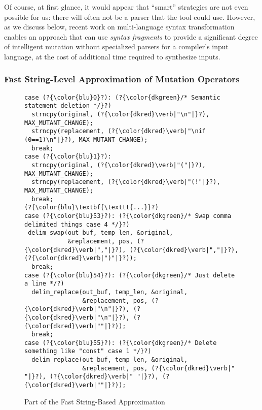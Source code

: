 Of course, at first
glance, it would appear that  ``smart'' strategies are not even
possible for us: there will often not be a parser that the
tool could use.  However, as we discuss below, recent work on
multi-language syntax transformation~\cite{combypaper} enables an approach that can use
\emph{syntax fragments} to provide a significant degree of intelligent
mutation without specialized parsers for a compiler's input language,
at the cost of additional time required to synthesize inputs.

\begin{sloppypar}
\subsubsection{Fast String-Level Approximation of Mutation Operators}
\label{strat-fast-string-level}

\begin{figure}[h!]
\begin{lstlisting}[basicstyle=\scriptsize\ttfamily,numbers=none,xleftmargin=0.7em,xrightmargin=.7em]
case (?{\color{blu}0}?): (?{\color{dkgreen}/* Semantic statement deletion */}?)
  strncpy(original, (?{\color{dkred}\verb|"\n"|}?), MAX_MUTANT_CHANGE);
  strncpy(replacement, (?{\color{dkred}\verb|"\nif (0==1)\n"|}?), MAX_MUTANT_CHANGE);
  break;
case (?{\color{blu}1}?):
  strncpy(original, (?{\color{dkred}\verb|"("|}?), MAX_MUTANT_CHANGE);
  strncpy(replacement, (?{\color{dkred}\verb|"(!"|}?), MAX_MUTANT_CHANGE);
  break;
(?{\color{blu}\textbf{\texttt{...}}?)
case (?{\color{blu}53}?): (?{\color{dkgreen}/* Swap comma delimited things case 4 */}?)
 delim_swap(out_buf, temp_len, &original, 
            &replacement, pos, (?{\color{dkred}\verb|","|}?), (?{\color{dkred}\verb|","|}?), (?{\color{dkred}\verb|")"|}?));
  break;
case (?{\color{blu}54}?): (?{\color{dkgreen}/* Just delete a line */?)
  delim_replace(out_buf, temp_len, &original, 
                &replacement, pos, (?{\color{dkred}\verb|"\n"|}?), (?{\color{dkred}\verb|"\n"|}?), (?{\color{dkred}\verb|""|}?));
  break;
case (?{\color{blu}55}?): (?{\color{dkgreen}/* Delete something like "const" case 1 */}?)
  delim_replace(out_buf, temp_len, &original, 
                &replacement, pos, (?{\color{dkred}\verb|" "|}?), (?{\color{dkred}\verb|" "|}?), (?{\color{dkred}\verb|""|}?));
\end{lstlisting}
\caption{Part of the Fast String-Based Approximation}
\label{fig:foperators}
\end{figure}


\end{sloppypar}

